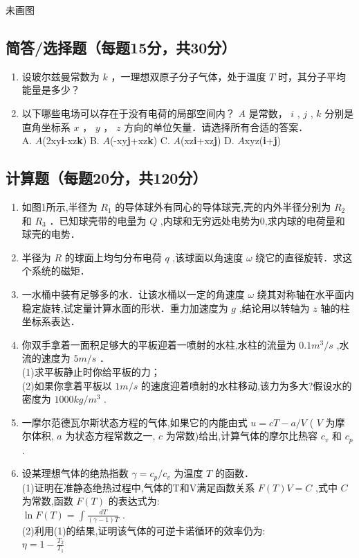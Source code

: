 
\begin{issues}
\issueTODO
未画图
\end{issues}


\subsection{简答/选择题（每题15分，共30分）}
\begin{enumerate}
\item 设玻尔兹曼常数为 $k$ ，一理想双原子分子气体，处于温度 $T$ 时，其分子平均能量是多少？
\item 以下哪些电场可以存在于没有电荷的局部空间内？ $A$ 是常数， $i$ , $j$ , $k$ 分别是直角坐标系 $x$ ， $y$ ， $z$ 方向的单位矢量．请选择所有合适的答案．\\
A. $A$(2xy\textbf{i}-xz\textbf{k}) B. $A$(-xy\textbf{j}+xz\textbf{k}) C. $A$(xz\textbf{i}+xz\textbf{j}) D. $A$xyz(\textbf{i}+\textbf{j})
\end{enumerate}
\subsection{计算题（每题20分，共120分）}
\begin{enumerate}
\item 如图1所示,半径为 $R_1$ 的导体球外有同心的导体球壳,壳的内外半径分别为 $R_2$ 和 $R_3$ ．已知球壳带的电量为 $Q$ ,内球和无穷远处电势为0,求内球的电荷量和球壳的电势．
\item 半径为 $R$ 的球面上均匀分布电荷 $q$ ,该球面以角速度 $\omega$ 绕它的直径旋转．求这个系统的磁矩．
\item 一水桶中装有足够多的水．让该水桶以一定的角速度 $\omega$ 绕其对称轴在水平面内稳定旋转,试定量计算水面的形状．重力加速度为 $g$ ,结论用以转轴为 $z$ 轴的柱坐标系表达．
\item 你双手拿着一面积足够大的平板迎着一喷射的水柱,水柱的流量为 $0.1m^{3}/s$ ,水流的速度为 $5m/s$ ．\\
(1)求平板静止时你给平板的力；\\
(2)如果你拿着平板以 $1m/s$ 的速度迎着喷射的水柱移动,该力为多大?假设水的密度为 $1000kg/m^{3}$ .
\item 一摩尔范德瓦尔斯状态方程的气体,如果它的内能由式 $u=cT-a/V$ ( $V$ 为摩尔体积, $a$ 为状态方程常数之一, $c$ 为常数)给出,计算气体的摩尔比热容 $c_v$ 和 $c_p$ .
\item 设某理想气体的绝热指数 $\gamma =c_p/c_v$ 为温度 $T$ 的函数．\\
(1)证明在准静态绝热过程中,气体的T和V满足函数关系 $F(T)V=C$ ,式中 $C$ 为常数,函数 $F(T)$ 的表达式为:\\
 $\ln F(T)=\int \frac{dT}{(\gamma-1)T}$ .\\
(2)利用(1)的结果,证明该气体的可逆卡诺循环的效率仍为:\\
$\eta =1-\frac{T_2}{T_1}$
\end{enumerate}